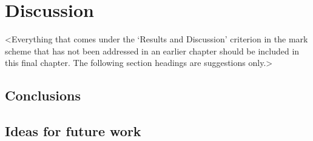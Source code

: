 \chapter{Discussion}
\label{chapter4}

<Everything that comes under the `Results and Discussion' criterion in the mark scheme that has not been addressed in an earlier chapter should be included in this final chapter. The following section headings are suggestions only.>

\section{Conclusions}
\lipsum[13]

\section{Ideas for future work}
\lipsum[14]

